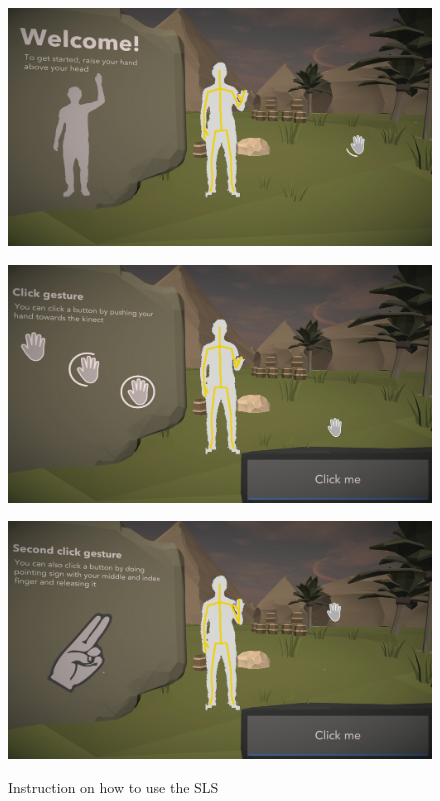 \begin{figure}[htb]
	\centering
	\begin{minipage}[t]{0.32\linewidth}
		\centering
		\includegraphics[width=1\linewidth]{Pictures/5_Workflow/1_Welcome}
		\label{fig:5_3_welcome}
	\end{minipage}
	\hfill
	\begin{minipage}[t]{0.32\linewidth}
		\centering
		\includegraphics[width=1\linewidth]{Pictures/5_Workflow/2_TutHandPush}
		\label{fig:5_3_tutHandPush}
	\end{minipage}
	\hfill
	\begin{minipage}[t]{0.32\linewidth}
		\centering
		\includegraphics[width=1\linewidth]{Pictures/5_Workflow/3_TutHandClick}
		\label{fig:5_3_tutHandPoint}
	\end{minipage}
	\caption{Instruction on how to use the SLS}
	\label{fig:5_3_tutorials}
\end{figure}

